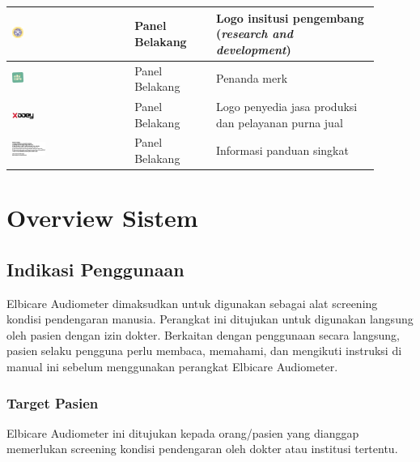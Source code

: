 \documentclass[11pt,a4paper,twoside,onecolumn]{book}
\begin{document}
\begin{longtable}{| p{0.3\linewidth} | p{0.2\linewidth}| p{0.4\linewidth}|}
				\hline
				\includegraphics[width=0.1\textwidth]{images/unair} & Panel Belakang & Logo insitusi pengembang (\emph{research and development})\\
				\hline
				\includegraphics[width=0.1\textwidth]{images/penanda-merk} & Panel Belakang & Penanda merk\\
				\hline
				\includegraphics[width=0.2\textwidth]{images/xirka} & Panel Belakang & Logo penyedia jasa produksi dan pelayanan purna jual\\
				\hline
				\includegraphics[width=0.3\textwidth]{images/manual} & Panel Belakang & Informasi panduan singkat\\
				\hline
			\end{longtable}
		
	\newpage
	
	\chapter{Overview Sistem}
		\section{Indikasi Penggunaan}
		Elbicare Audiometer dimaksudkan untuk digunakan sebagai alat screening kondisi pendengaran manusia. Perangkat ini ditujukan untuk digunakan langsung oleh pasien dengan izin dokter. Berkaitan dengan penggunaan secara langsung, pasien selaku pengguna perlu membaca, memahami, dan mengikuti instruksi di manual ini sebelum menggunakan perangkat Elbicare Audiometer.
			\subsection{Target Pasien}
			Elbicare Audiometer ini ditujukan kepada orang/pasien yang dianggap memerlukan screening kondisi pendengaran oleh dokter atau institusi tertentu.
\end{document}
